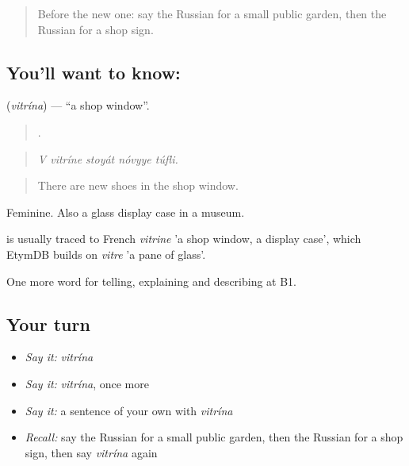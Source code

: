 \label{lesson:RU-C446-vitrina}



\begin{quote}
Before the new one: say the Russian for a small public garden, then the Russian for a shop sign.
\end{quote}

\subsection*{You'll want to know: }
\textbf{} (\emph{vitrína}) — \textquotedblleft{}a shop window\textquotedblright{}.

\begin{quote}
    .
\end{quote}

\begin{quote}
\emph{V vitríne stoyát nóvyye túfli.}
\end{quote}

\begin{quote}
There are new shoes in the shop window.
\end{quote}

Feminine. Also a glass display case in a museum.

\begin{cousinweb}
\emph{} is usually traced to French \emph{vitrine} 'a shop window, a display case', which EtymDB builds on \emph{vitre} 'a pane of glass'.
\end{cousinweb}

\begin{grammarlens}[title={What you've built}]
One more word for telling, explaining and describing at B1.
\end{grammarlens}

\subsection*{Your turn}
\begin{itemize}
\raggedright
  \item \emph{Say it:} \emph{vitrína}
  \item \emph{Say it:} \emph{vitrína}, once more
  \item \emph{Say it:} a sentence of your own with \emph{vitrína}
  \item \emph{Recall:} say the Russian for a small public garden, then the Russian for a shop sign, then say \emph{vitrína} again
\end{itemize}

